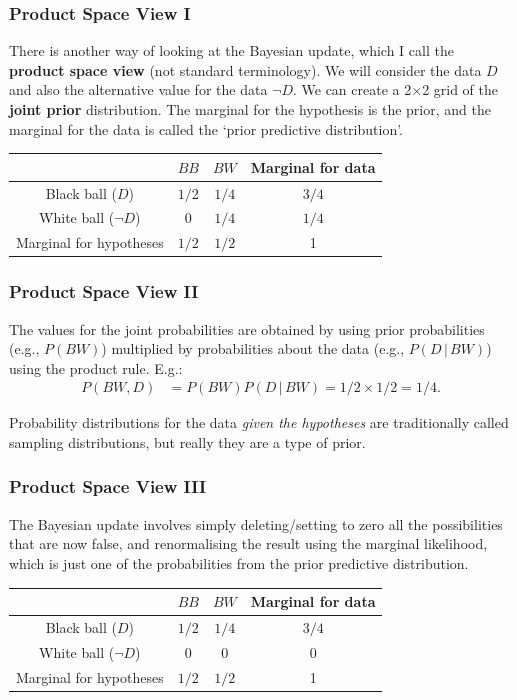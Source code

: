 \documentclass{beamer}
\newcommand{\given}{\,|\,}
\begin{document}
\begin{frame}
\frametitle{Product Space View I}
There is another way of looking at the Bayesian update, which I call the
{\bf product space view} (not standard terminology).
We will consider the data $D$ and also the alternative value for the data
$\neg D$. We can create a 2$\times$2 grid of the {\bf joint
prior} distribution. The marginal for the hypothesis is the prior,
and the marginal for the data is called the `prior predictive
distribution'.
\begin{center}
\begin{tabular}{|c|cc|c|}
\hline
   &  $BB$ &  $BW$ & Marginal for data\\
\hline
Black ball ($D$)      &  $1/2$  &  $1/4$     & $3/4$\\
White ball ($\neg D$) &  0      &  $1/4$     & $1/4$\\
\hline
Marginal for hypotheses   &  $1/2$  & $1/2$  & 1\\
\hline
\end{tabular}
\end{center}

\end{frame}

\begin{frame}
\frametitle{Product Space View II}
The values for the joint probabilities are obtained by using
prior probabilities (e.g., $P(BW)$) multiplied by
probabilities about the data (e.g., $P(D \given BW)$) using the product
rule. E.g.:
\begin{align}
P(BW, D) &= P(BW)P(D \given BW) = 1/2 \times 1/2 = 1/4.
\end{align}

\pause

Probability distributions for the data {\em given the hypotheses} are
traditionally called sampling distributions, but really they are
a type of prior.

\end{frame}



\begin{frame}
\frametitle{Product Space View III}
The Bayesian update involves simply deleting/setting to zero
all the possibilities that are now false, and renormalising the
result using the marginal likelihood, which is just one of the
probabilities from the prior predictive distribution.
\begin{center}
\begin{tabular}{|c|cc|c|}
\hline
   &  $BB$ &  $BW$ & Marginal for data\\
\hline
Black ball ($D$)      &  $1/2$  &  $1/4$     & $3/4$\\
\rowcolor{LightRed}
White ball ($\neg D$) &  0      &  0     & 0 \\
\hline
Marginal for hypotheses  &  $1/2$  & $1/2$  & 1\\
\hline
\end{tabular}
\end{center}

\end{frame}
\end{document}

